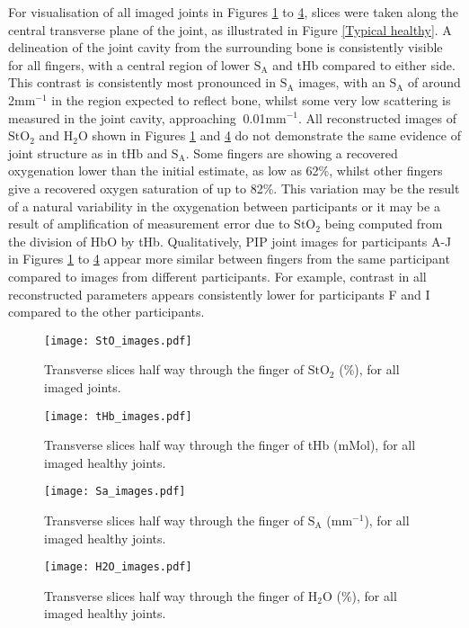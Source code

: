 \documentclass[twoside]{bhamthesis}
\theoremstyle{definition}
\begin{document}
For visualisation of all imaged joints in Figures \ref{fig1} to \ref{fig4}, slices were taken along the central transverse plane of the joint, as illustrated in Figure \ref{Typical healthy}. A delineation of the joint cavity from the surrounding bone is consistently visible for all fingers, with a central region of lower $\mathrm{S_A}$ and tHb compared to either side. This contrast is consistently most pronounced in $\mathrm{S_A}$ images, with an $\mathrm{S_A}$ of around 2mm$^{-1}$ in the region expected to reflect bone, whilst some very low scattering is measured in the joint cavity, approaching $~$0.01mm$^{-1}$. All reconstructed images of $\mathrm{StO_2}$ and $\mathrm{H_2O}$ shown in Figures \ref{fig1} and \ref{fig4} do not demonstrate the same evidence of joint structure as in tHb and $\mathrm{S_A}$. Some fingers are showing a recovered oxygenation lower than the initial estimate, as low as 62\%, whilst other fingers give a recovered oxygen saturation of up to 82\%. This variation may be the result of a natural variability in the oxygenation between participants or it may be a result of amplification of measurement error due to $\mathrm{StO_2}$ being computed from the division of HbO by tHb. Qualitatively, PIP joint images for participants A-J in Figures \ref{fig1} to \ref{fig4} appear more similar between fingers from the same participant compared to images from different participants. For example, contrast in all reconstructed parameters appears consistently lower for participants F and I compared to the other participants.

\begin{figure}[!ht]
\centering\texttt{[image: StO\_images.pdf]}
\caption{Transverse slices half way through the finger of $\mathrm{StO_2}$ (\%), for all imaged joints.}
\label{fig1}
\end{figure}

\begin{figure}[!ht]
\centering\texttt{[image: tHb\_images.pdf]}
\caption{Transverse slices half way through the finger of tHb (mMol), for all imaged healthy joints.}
\label{fig2}
\end{figure}

\begin{figure}[!ht]
\centering\texttt{[image: Sa\_images.pdf]}
\caption{Transverse slices half way through the finger of $\mathrm{S_A}$ (mm$^{-1}$), for all imaged healthy joints.}
\label{fig3}
\end{figure}

\begin{figure}[!ht]
\centering\texttt{[image: H2O\_images.pdf]}
\caption{Transverse slices half way through the finger of $\mathrm{H_2O}$ (\%), for all imaged healthy joints.}
\label{fig4}
\end{figure}
\end{document}
